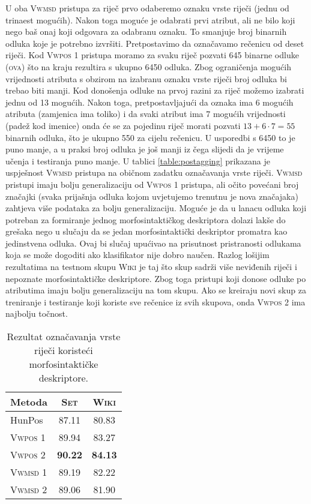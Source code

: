 U oba \textsc{Vwmsd} pristupa za riječ prvo odaberemo oznaku vrste riječi (jednu
od trinaest mogućih). Nakon toga moguće je odabrati prvi atribut, ali ne bilo
koji nego baš onaj koji odgovara za odabranu oznaku. To smanjuje broj binarnih
odluka koje je potrebno izvršiti. Pretpostavimo da označavamo rečenicu od deset
riječi. Kod \textsc{Vwpos 1} pristupa moramo za svaku riječ pozvati 645 binarne
odluke (\textsc{ova}) što na kraju rezultira s ukupno 6450 odluka. Zbog
ograničenja mogućih vrijednosti atributa s obzirom na izabranu oznaku vrste
riječi broj odluka bi trebao biti manji. Kod donošenja odluke na prvoj razini za
riječ možemo izabrati jednu od 13 mogućih. Nakon toga, pretpostavljajući da
oznaka ima 6 mogućih atributa (zamjenica ima toliko) i da svaki atribut ima 7
mogućih vrijednosti (padež kod imenice) onda će se za pojedinu riječ morati
pozvati $13+6 \cdot 7 = 55$ binarnih odluka, što je ukupno 550 za cijelu
rečenicu. U usporedbi s 6450 to je puno manje, a u praksi broj odluka je još
manji iz čega slijedi da je vrijeme učenja i testiranja puno manje. U tablici
\ref{table:postagging} prikazana je uspješnost \textsc{Vwmsd} pristupa na
običnom zadatku označavanja vrste riječi. \textsc{Vwmsd} pristupi imaju bolju
generalizaciju od \textsc{Vwpos 1} pristupa, ali očito povećani broj značajki
(svaka prijašnja odluka kojom uvjetujemo trenutnu je nova značajaka) zahtjeva
više podataka za bolju generalizaciju. Moguće je da u lanacu odluka koji
potreban za formiranje jednog morfosintaktičkog deskriptora dolazi lakše do
grešaka nego u slučaju da se jedan morfosintaktički deskriptor promatra kao
jedinstvena odluka. Ovaj bi slučaj upućivao na prisutnost pristranosti odlukama
koja se može dogoditi ako klasifikator nije dobro naučen. Razlog lošijim
rezultatima na testnom skupu \textsc{Wiki} je taj što skup sadrži više neviđenih
riječi i nepoznate morfosintaktičke deskriptore. Zbog toga pristupi koji donose
odluke po atributima imaju bolju generalizaciju na tom skupu. Ako se kreiraju
novi skup za treniranje i testiranje koji koriste sve rečenice iz svih skupova,
onda \textsc{Vwpos 2} ima najbolju točnost.

\begin{table}[]
\centering
\caption{Rezultat označavanja vrste riječi koristeći morfosintaktičke
deskriptore.}
\label{table:msdtagging}
\begin{tabular}{|l|c|c|}
\hline
Metoda             & \textsc{Set}   & \textsc{Wiki}  \\ \hline \hline
HunPos             & 87.11          & 80.83          \\
\textsc{Vwpos 1}   & 89.94          & 83.27          \\
\textsc{Vwpos 2}   & \textbf{90.22} & \textbf{84.13} \\
\textsc{Vwmsd 1}   & 89.19          & 82.22          \\
\textsc{Vwmsd 2}   & 89.06          & 81.90          \\ \hline
\end{tabular}
\end{table}
